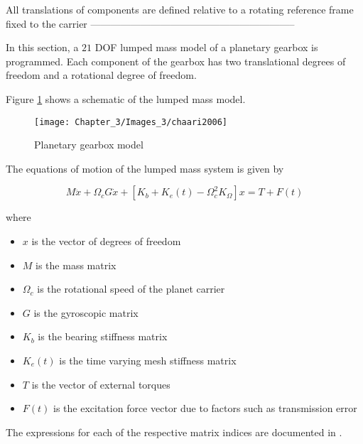 All translations of components are defined relative to a rotating reference frame fixed to the carrier
--------------------------------------------------------------


In this section, a $21$ DOF lumped mass model of a planetary gearbox \citep{Chaari2006} is programmed. Each component of the gearbox has two translational degrees of freedom and a rotational degree of freedom.

Figure \ref{F:model} shows a schematic of the lumped mass model. 

\begin{figure}[H]
	\centering
	\texttt{[image: Chapter\_3/Images\_3/chaari2006]}
	\caption{Planetary gearbox model \citep{Chaari2006}}
	\label{F:model}
\end{figure}

The equations of motion of the lumped mass system is given by 

\begin{equation}
M \ddot{x}+\Omega_{c} G \dot{x}+\left[K_{b}+K_{e}(t)-\Omega_{c}^{2} K_{\Omega}\right] x=T+F(t)
\end{equation}

where 
\begin{itemize}
	\item $x$ is the vector of degrees of freedom
	\item $M$ is the mass matrix
	\item $\Omega_{c}$ is the rotational speed of the planet carrier
	\item $G$ is the gyroscopic matrix 
	\item $K_{b}$ is the bearing stiffness matrix
	\item $K_{e}(t)$ is the time varying mesh stiffness matrix
	\item $T$ is the vector of external torques
	\item $F(t)$ is the excitation force vector due to factors such as transmission error        
\end{itemize}

The expressions for each of the respective matrix indices are documented in \cite{Chaari2006}.


